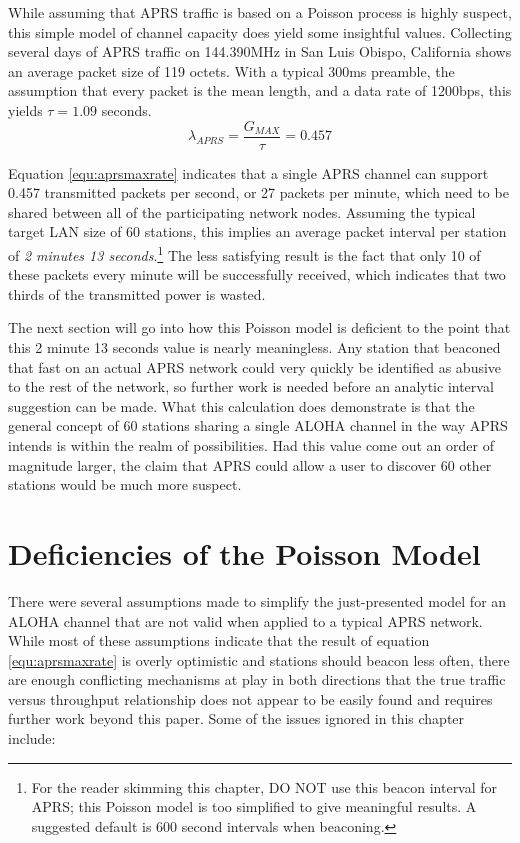 While assuming that APRS traffic is based on a Poisson process is 
highly suspect, this simple model of channel capacity does yield some insightful 
values. 
Collecting several days of APRS traffic on 144.390MHz in San Luis Obispo, California
shows an average packet size of 119 octets. With a typical 300ms preamble,
the assumption that every packet is the mean length,
and a data rate of 1200bps, this yields $\tau = 1.09$ seconds.
\begin{equation}
	\lambda_{APRS} = \frac{G_{MAX}}{\tau} = 0.457
	\label{equ:aprsmaxrate}
\end{equation}

Equation \ref{equ:aprsmaxrate} indicates that a single APRS channel can support
0.457 transmitted packets per second, or
27 packets per minute, which need to be shared between
all of the participating network nodes.
Assuming the typical target LAN size of 60 stations, 
this implies an average packet interval per station
of \emph{2 minutes 13 seconds}.\footnote{For the reader skimming this chapter, DO NOT
	use this beacon interval for APRS; this Poisson model is too simplified to give
meaningful results. A suggested default is 600 second intervals when beaconing.}
The less satisfying result is the fact that only 10 of these packets every minute will be
successfully received, which indicates that
two thirds of the transmitted power is wasted.

The next section will go into how this Poisson model is deficient to the
point that this 2 minute 13 seconds value is nearly meaningless.
Any station that beaconed that fast on an actual APRS network could very quickly
be identified as abusive to the rest of the network, so further work is needed
before an analytic interval suggestion can be made.
What this calculation does demonstrate is that the general concept of 60 stations
sharing a single ALOHA channel in the way APRS intends is within the realm of
possibilities. 
Had this value come out an order of magnitude larger, the claim
that APRS could allow a user to discover 60 other stations would be much more suspect.

\section{Deficiencies of the Poisson Model}

There were several assumptions made to simplify the just-presented model 
for an ALOHA channel that are not valid when applied to a typical APRS network. 
While most of these assumptions indicate that the result of
equation \ref{equ:aprsmaxrate} is overly optimistic and 
stations should beacon less often, there are enough conflicting mechanisms at play
in both directions that the true traffic versus throughput relationship 
does not appear to be easily found and requires further work beyond this paper.
Some of the issues ignored in this chapter include:

